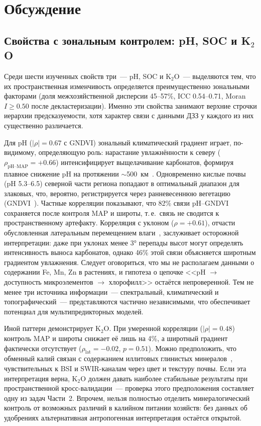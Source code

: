 \section{Обсуждение}
\label{sec:discussion}

\subsection{Свойства с зональным контролем: pH, SOC и K$_2$O}

Среди шести изученных свойств три~--- pH, SOC и K$_2$O~--- выделяются тем, что их пространственная изменчивость определяется преимущественно зональными факторами (доля межхозяйственной дисперсии 45--57\%, ICC 0.54--0.71, Moran~$I \geq 0.50$ после декластеризации). Именно эти свойства занимают верхние строчки иерархии предсказуемости, хотя характер связи с данными ДЗЗ у каждого из них существенно различается.

Для pH ($|\rho| = 0.67$ с GNDVI) зональный климатический градиент играет, по-видимому, определяющую роль: нарастание увлажнённости к северу ($\rho_{\text{pH--MAP}} = +0.66$) интенсифицирует выщелачивание карбонатов, формируя плавное снижение pH на протяжении $\sim$500~км~\citep{Jenny1941}. Одновременно кислые почвы (pH 5.3--6.5) северной части региона попадают в оптимальный диапазон для злаковых, что, вероятно, регистрируется через ранневесеннюю вегетацию (GNDVI~\citep{Gitelson1996}). Частные корреляции показывают, что 82\% связи pH--GNDVI сохраняется после контроля MAP и широты, т.\,е.\ связь не сводится к пространственному артефакту. Корреляция с уклоном ($\rho = +0.61$), отчасти обусловленная латеральным перемещением влаги~\citep{McBratney2003}, заслуживает осторожной интерпретации: даже при уклонах менее $3°$ перепады высот могут определять интенсивность выноса карбонатов, однако 46\% этой связи объясняется широтным градиентом увлажнения. Следует оговориться, что мы не располагаем данными о содержании Fe, Mn, Zn в растениях, и гипотеза о цепочке <<pH $\to$ доступность микроэлементов $\to$ хлорофилл>> остаётся непроверенной. Тем не менее три источника информации~--- спектральный, климатический и топографический~--- представляются частично независимыми, что обеспечивает потенциал для мультипредикторных моделей.

Иной паттерн демонстрирует K$_2$O. При умеренной корреляции ($|\rho| = 0.48$) контроль MAP и широты снижает её лишь на 4\%, а широтный градиент фактически отсутствует ($\rho_{\text{lat}} = -0.02$, $p = 0.51$). Можно предположить, что обменный калий связан с содержанием иллитовых глинистых минералов~\citep{Barre2014}, чувствительных к BSI и SWIR-каналам через цвет и текстуру почвы. Если эта интерпретация верна, K$_2$O должен давать наиболее стабильные результаты при пространственной кросс-валидации~--- проверка этого предположения составляет одну из задач Части~2. Впрочем, нельзя полностью отделить минералогический контроль от возможных различий в калийном питании хозяйств: без данных об удобрениях альтернативная антропогенная интерпретация остаётся открытой.

